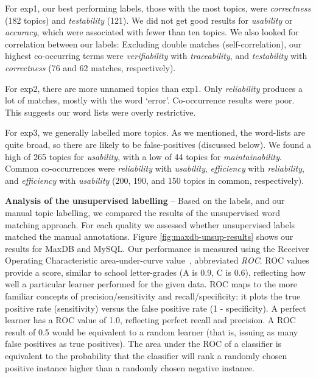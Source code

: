 \documentclass[]{sig-alternate}
\begin{document}
For \textsf{exp1}, our best performing labels, those with the most topics, were \emph{correctness} (182 topics) and \emph{testability} (121). 
We did not get good results for \emph{usability} or \emph{accuracy}, which were associated with fewer than ten topics. 
We also looked for correlation between our labels: Excluding double matches (self-correlation), our highest co-occurring terms were \emph{verifiability} with \emph{traceability}, and \emph{testability} with \emph{correctness} (76 and 62 matches, respectively).

For \textsf{exp2}, there are more unnamed topics than \textsf{exp1}. 
Only \emph{reliability} produces a lot of matches, mostly with the word `error'. 
Co-occurrence results were poor. This suggests our word lists were overly restrictive.

For \textsf{exp3}, we generally labelled more topics. 
As we mentioned, the word-lists are quite broad, so there are likely to be false-positives (discussed below). 
We found a high of 265 topics for \emph{usability}, with a low of 44 topics for \emph{maintainability}. 
Common co-occurrences were \emph{reliability} with \emph{usability}, \emph{efficiency} with \emph{reliability}, and \emph{efficiency} with \emph{usability} (200, 190, and 150 topics in common, respectively). 



\noindent \textbf{Analysis of the unsupervised labelling} -- Based on the labels, and our manual topic labelling, 
we compared the results of the unsupervised word matching approach. 
For each quality we assessed whether unsupervised labels matched the manual annotations.
Figure \ref{fig:maxdb-unsup-results} shows our results for MaxDB and MySQL. 
Our performance is measured using the Receiver Operating Characteristic area-under-curve value~\cite{Fawcett2006861}, abbreviated \emph{ROC}. 
ROC values provide a score, similar to school letter-grades (A is 0.9, C is 0.6), reflecting how well a particular learner performed for the given data. 
ROC maps to the more familiar concepts of precision/sensitivity and recall/specificity: it plots the true positive rate (sensitivity) versus the false positive rate (1 - specificity). 
A perfect learner has a ROC value of 1.0, reflecting perfect recall and precision. 
A ROC result of 0.5 would be equivalent to a random learner (that is, issuing as many false positives as true positives). 
The area under the ROC of a classifier is equivalent to the probability that the classifier will rank a randomly chosen positive instance higher than a randomly chosen negative instance.
\end{document}
